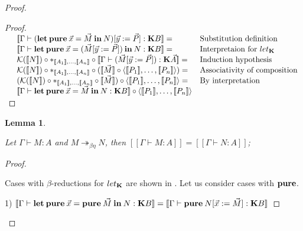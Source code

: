 \documentclass[a4paper]{article}
\newtheorem{lemma}{Lemma}
\begin{document}
\begin{proof}
\begin{proof}
\vspace{\baselineskip}

$\begin{array}{lll}
&[\![\Gamma \vdash ({\bf let \: pure} \: \vec{x} = \vec{M} {\: \bf in \:} N) [\vec{y} := \vec{P}] : {\bf K} B]\!] =& \text{Substitution definition}\\
&[\![\Gamma \vdash {\bf let \: pure} \: \vec{x} = (\vec{M} [\vec{y} := \vec{P}]) {\: \bf in \:} N : {\bf K}B]\!] =& \text{Interpretaion for $let_{\bf K}$} \\
&\mathcal{K}([\![N]\!]) \circ \ast_{[\![A_1]\!],\dots,[\![A_n]\!]} \circ [\![\Gamma \vdash (\vec{M} [\vec{y} := \vec{P}]) : {\bf K}\vec{A}]\!] =& \text{Induction hypothesis} \\
&\mathcal{K}([\![N]\!]) \circ \ast_{[\![A_1]\!],\dots,[\![A_n]\!]} \circ ([\![\vec{M}]\!] \circ \langle [\![P_1]\!],\dots,[\![P_n]\!]\rangle) = & \text{Associativity of composition} \\
&(\mathcal{K}([\![N]\!]) \circ \ast_{[\![A_1]\!],\dots,[\![A_n]\!]} \circ [\![\vec{M}]\!]) \circ \langle [\![P_1]\!],\dots,[\![P_n]\!]\rangle = & \text{By interpretation} \\
&[\![\Gamma \vdash {\bf let \: pure} \: \vec{x} = \vec{M} {\: \bf in \:} N : {\bf K}B]\!] \circ \langle [\![P_1]\!],\dots,[\![P_n]\!]\rangle&
\end{array}$

\end{proof}

\begin{lemma}
  $ $

  Let $\Gamma \vdash M : A$ and $M \twoheadrightarrow_{\beta \eta} N$, then $[\![\Gamma \vdash M : A]\!] = [\![\Gamma \vdash N : A]\!]$;
\end{lemma}

\begin{proof}
  $ $

Cases with $\beta$-reductions for $let_{\bf K}$ are shown in \cite{ModalK1}. Let us consider cases with ${\bf pure}$.

\vspace{\baselineskip}

1) $[\![\Gamma \vdash {\bf let \: pure \:} \vec{x} = {\bf pure \:} \vec{M} {\: \bf in \:} N : {\bf K}B]\!] = [\![\Gamma \vdash {\bf pure \:} N [\vec{x} := \vec{M}] : {\bf K}B]\!]$

\vspace{\baselineskip}


\end{proof}
\end{proof}
\end{document}
